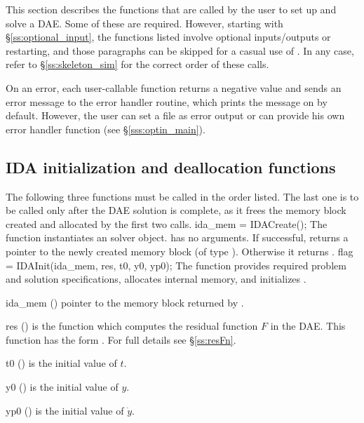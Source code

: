 This section describes the {\ida} functions that are called by the
user to set up and solve a DAE. Some of these are required. However,
starting with \S\ref{ss:optional_input}, the functions listed involve
optional inputs/outputs or restarting, and those paragraphs can be
skipped for a casual use of {\ida}. In any case, refer to
\S\ref{ss:skeleton_sim} for the correct order of these calls.

On an error, each user-callable function returns a negative value and
sends an error message to the error handler routine, which prints the
message on  by default. However, the user can set a file
as error output or can provide his own error handler function (see
\S\ref{sss:optin_main}).

\subsection{IDA initialization and deallocation functions}
\label{sss:idainit}
The following three functions must be called in the order listed. The last one
is to be called only after the DAE solution is complete, as it frees the {\ida}
memory block created and allocated by the first two calls.
{
  ida\_mem = IDACreate();
}
{
  The function  instantiates an {\ida} solver object.
}
{
   has no arguments.
}
{
  If successful,  returns a pointer to the newly created 
  {\ida} memory block (of type ).  Otherwise it returns .
}
{}
{
  flag = IDAInit(ida\_mem, res, t0, y0, yp0);
}
{
  The function  provides required problem and solution
  specifications, allocates internal memory, and initializes {\ida}.
}
{
  \begin{args}
  \item[ida\_mem] ()
    pointer to the {\ida} memory block returned by .
  \item[res] ()
    is the {\C} function which computes the residual function $F$ in the DAE.
     This function has the form .
     For full details see \S\ref{ss:resFn}.
  \item[t0] ()
    is the initial value of $t$.
  \item[y0] ()
    is the initial value of $y$. 
  \item[yp0] ()
    is the initial value of $\dot{y}$. 
  \end{args}
}
